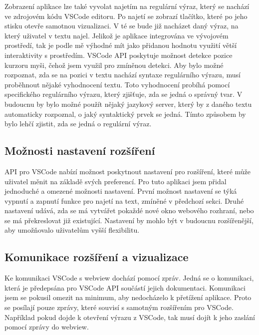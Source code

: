 Zobrazení aplikace lze také vyvolat najetím na regulární výraz, který se nachází ve zdrojovém kódu VSCode editoru.
Po najetí se zobrazí tlačítko, které po jeho stisku otevře samotnou vizualizaci.
V té se bude již nacházet daný výraz, na který uživatel v textu najel.
Jelikož je aplikace integrována ve vývojovém prostředí, tak je podle mě výhodné mít jako přidanou hodnotu využití větší interaktivity s prostředím.
VSCode API poskytuje možnost detekce pozice kurzoru myši, čehož jsem využil pro zmíněnou detekci.
Aby bylo možné rozpoznat, zda se na pozici v textu nachází syntaxe regulárního výrazu, musí proběhnout nějaké vyhodnocení textu.
Toto vyhodnocení probíhá pomocí specifického regulárního výrazu, který zjišťuje, zda se jedná o správný tvar.
V budoucnu by bylo možné použít nějaký jazykový server, který by z daného textu automaticky rozpoznal, o jaký syntaktický prvek se jedná.
Tímto způsobem by bylo lehčí zjistit, zda se jedná o regulární výraz.

\subsection*{Možnosti nastavení rozšíření}

API pro VSCode nabízí možnost poskytnout nastavení pro rozšíření, které může uživatel měnit na základě svých preferencí.
Pro tuto aplikaci jsem přidal jednoduché a omezené možnosti nastavení.
První možnost nastavení se týká vypnutí a zapnutí funkce pro najetí na text, zmíněné v předchozí sekci.
Druhé nastavení udává, zda se má vytvářet pokaždé nové okno webového rozhraní, nebo se má překreslovat již existující.
Nastavení by mohlo být v budoucnu rozšířenější, aby umožňovalo uživatelům vyšší flexibilitu. 

\subsection*{Komunikace rozšíření a vizualizace}

Ke komunikaci VSCode s webview dochází pomocí zpráv.
Jedná se o komunikaci, která je předepsána pro VSCode API součástí jejich dokumentaci\cite{Microsoft_2021_2}.
Komunikaci jsem se pokusil omezit na minimum, aby nedocházelo k přetížení aplikace.
Proto se posílají pouze zprávy, které souvisí s samotným rozšířením pro VSCode.
Například pokud dojde k otevření výrazu z VSCode, tak musí dojít k jeho zaslání pomocí zprávy do webview.

\endinput